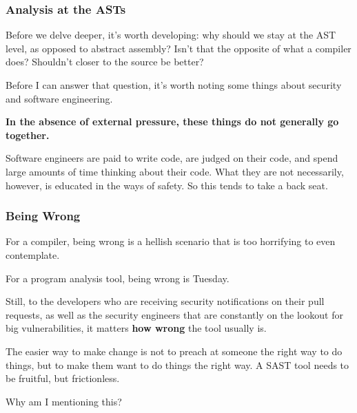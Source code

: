\documentclass[aspectratio=169, handout]{beamer}
\begin{document}


\begin{frame}[fragile]
  \frametitle{Analysis at the ASTs}

  Before we delve deeper, it's worth developing: why should we stay at the
  AST level, as opposed to abstract assembly? Isn't that the opposite of what
  a compiler does? Shouldn't closer to the source be better?

  \pause
  \vspace{\fill}

  Before I can answer that question, it's worth noting some things about
  security and software engineering.

  \pause
  \vspace{\fill}

  \textbf{In the absence of external pressure, these things do not generally go together.}

  \pause
  \vspace{\fill}

  Software engineers are paid to write code, are judged on their code, and spend
  large amounts of time thinking about their code. What they are not necessarily,
  however, is educated in the ways of safety. So this tends to take a back seat.
\end{frame}

\begin{frame}[fragile]
  \frametitle{Being Wrong}

  For a compiler, being wrong is a hellish scenario that is too horrifying
  to even contemplate.

  \pause
  \vspace{\fill}

  For a program analysis tool, being wrong is Tuesday.

  \pause
  \vspace{\fill}

  Still, to the developers who are receiving security notifications on their
  pull requests, as well as the security engineers that are constantly on the
  lookout for big vulnerabilities, it matters \textbf{how wrong} the tool
  usually is.

  \pause
  \vspace{\fill}

  The easier way to make change is not to preach at someone the right
  way to do things, but to make them want to do things the right way. A
  SAST tool needs to be fruitful, but frictionless.

  \pause
  \vspace{\fill}

  Why am I mentioning this?
\end{frame}
\end{document}
